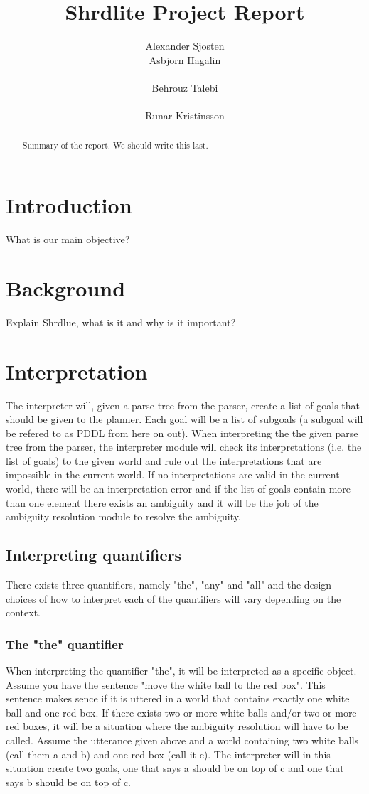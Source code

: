\documentclass[11pt]{article}
\title{Shrdlite Project Report}
\author{Alexander Sjosten
  \\\And
  Asbjorn Hagalin \\
  \\\And
  Behrouz Talebi  \\
  \\\And
  Runar Kristinsson \\}
\date{}
\begin{document}
\maketitle
\begin{abstract}
Summary of the report. We should write this last.
\end{abstract}


\section{Introduction}
What is our main objective?


\section{Background}
Explain Shrdlue, what is it and why is it important?


\section{Interpretation}
The interpreter will, given a parse tree from the parser, create a list of goals that should be given to the planner. Each goal will be a list of subgoals (a subgoal will be refered to as PDDL from here on out). When interpreting the the given parse tree from the parser, the interpreter module will check its interpretations (i.e. the list of goals) to the given world and rule out the interpretations that are impossible in the current world. If no interpretations are valid in the current world, there will be an interpretation error and if the list of goals contain more than one element there exists an ambiguity and it will be the job of the ambiguity resolution module to resolve the ambiguity.

\subsection{Interpreting quantifiers}
There exists three quantifiers, namely "the", "any" and "all" and the design choices of how to interpret each of the quantifiers will vary depending on the context.

\subsubsection{The "the" quantifier}
When interpreting the quantifier "the", it will be interpreted as a specific object. Assume you have the sentence "move the white ball to the red box". This sentence makes sence if it is uttered in a world that contains exactly one white ball and one red box. If there exists two or more white balls and/or two or more red boxes, it will be a situation where the ambiguity resolution will have to be called. Assume the utterance given above and a world containing two white balls (call them a and b) and one red box (call it c). The interpreter will in this situation create two goals, one that says a should be on top of c and one that says b should be on top of c.
\end{document}
